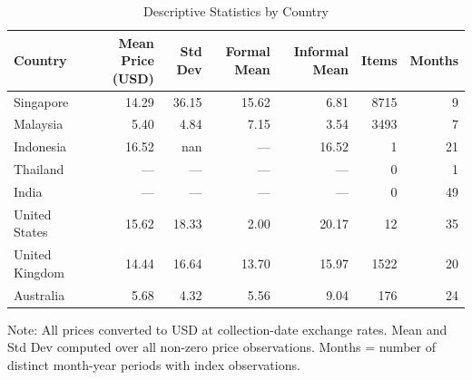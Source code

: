 \begin{table}[htbp]
        \centering
        \caption{Descriptive Statistics by Country}
        \label{tab:descriptive}
        \begin{tabular}{lrrrrrr}
        \toprule
        \textbf{Country} & \textbf{Mean Price (USD)} & \textbf{Std Dev} & \textbf{Formal Mean} & \textbf{Informal Mean} & \textbf{Items} & \textbf{Months} \\
        \midrule
        Singapore & 14.29 & 36.15 & 15.62 & 6.81 & 8715 & 9 \\
Malaysia & 5.40 & 4.84 & 7.15 & 3.54 & 3493 & 7 \\
Indonesia & 16.52 & nan & — & 16.52 & 1 & 21 \\
Thailand & — & — & — & — & 0 & 1 \\
India & — & — & — & — & 0 & 49 \\
United States & 15.62 & 18.33 & 2.00 & 20.17 & 12 & 35 \\
United Kingdom & 14.44 & 16.64 & 13.70 & 15.97 & 1522 & 20 \\
Australia & 5.68 & 4.32 & 5.56 & 9.04 & 176 & 24 \\
        \bottomrule
        \end{tabular}
        \footnotesize Note: All prices converted to USD at collection-date exchange rates. Mean and Std Dev computed over all non-zero price observations. Months = number of distinct month-year periods with index observations.
        \end{table}